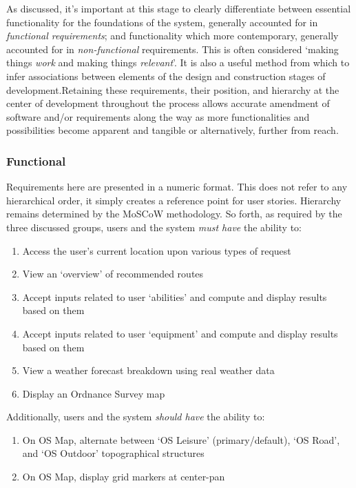 \documentclass[11pt, english]{article}
\begin{document}
	As discussed, it's important at this stage to clearly differentiate between essential functionality for the foundations of the system, generally accounted for in \textit{functional requirements}; and functionality which more contemporary, generally accounted for in \textit{non-functional} requirements. This is often considered `making things \textit{work} and making things \textit{relevant}'. It is also a useful method from which to infer associations between elements of the design and construction stages of development.Retaining these requirements, their position, and hierarchy at the center of development throughout the process allows accurate amendment of software and/or requirements along the way as more functionalities and possibilities become apparent and tangible or alternatively, further from reach.

		\subsubsection{Functional}

	Requirements here are presented in a numeric format. This does not refer to any hierarchical order, it simply creates a reference point for user stories. Hierarchy remains determined by the MoSCoW methodology. So forth, as required by the three discussed groups, users and the system \textit{must have} the ability to:

	\begin{enumerate}
	\setlength\itemsep{0cm}
		\item Access the user's current location upon various types of request
		\item View an `overview' of recommended routes
		\item Accept inputs related to user `abilities' and compute and display results based on them
		\item Accept inputs related to user `equipment' and compute and display results based on them
		\item View a weather forecast breakdown using real weather data
		\item Display an Ordnance Survey map
	\end{enumerate}

	Additionally, users and the system \textit{should have} the ability to:

	\begin{enumerate}
	\setlength\itemsep{0cm}
		\item On OS Map, alternate between `OS Leisure' (primary/default), `OS Road', and `OS Outdoor' topographical structures
		\item On OS Map, display grid markers at center-pan
	\end{enumerate}
\end{document}
